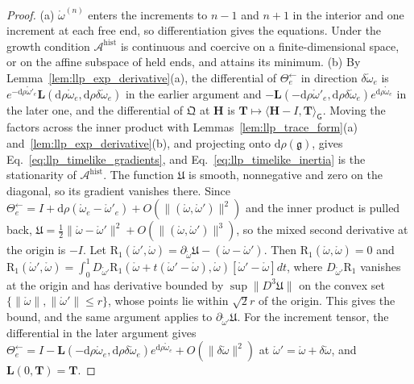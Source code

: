 \begin{proof}
(a) $\mathring\omega^{(n)}$ enters the increments to $n-1$ and $n+1$ in the interior and one increment at each free end, so differentiation gives the equations. Under the growth condition $\mathcal A^{\mathrm{hist}}$ is continuous and coercive on a finite-dimensional space, or on the affine subspace of held ends, and attains its minimum.
(b) By Lemma~\ref{lem:llp_exp_derivative}(a), the differential of $\Theta^{\leftarrow}_e$ in direction $\delta\mathring\omega_e$ is $e^{-\mathrm d\rho\mathring\omega'_e}\mathbf L(\mathrm d\rho\mathring\omega_e,\mathrm d\rho\delta\mathring\omega_e)$ in the earlier argument and $-\mathbf L(-\mathrm d\rho\mathring\omega'_e,\mathrm d\rho\delta\mathring\omega_e)e^{\mathrm d\rho\mathring\omega_e}$ in the later one, and the differential of $\mathfrak Q$ at $\mathbf H$ is $\mathbf T\mapsto\langle\mathbf H-I,\mathbf T\rangle_{\mathsf G}$. Moving the factors across the inner product with Lemmas~\ref{lem:llp_trace_form}(a) and~\ref{lem:llp_exp_derivative}(b), and projecting onto $\mathrm d\rho(\mathfrak g)$, gives Eq.~\eqref{eq:llp_timelike_gradients}, and Eq.~\eqref{eq:llp_timelike_inertia} is the stationarity of $\mathcal A^{\mathrm{hist}}$. The function $\mathfrak U$ is smooth, nonnegative and zero on the diagonal, so its gradient vanishes there. Since $\Theta^{\leftarrow}_e=I+\mathrm d\rho(\mathring\omega_e-\mathring\omega'_e)+O(\|(\mathring\omega,\mathring\omega')\|^2)$ and the inner product is pulled back, $\mathfrak U=\frac12\|\mathring\omega-\mathring\omega'\|^2+O(\|(\mathring\omega,\mathring\omega')\|^3)$, so the mixed second derivative at the origin is $-I$. Let $\mathrm R_1(\mathring\omega',\mathring\omega)=\partial_{\mathring\omega}\mathfrak U-(\mathring\omega-\mathring\omega')$. Then $\mathrm R_1(\mathring\omega,\mathring\omega)=0$ and $\mathrm R_1(\mathring\omega',\mathring\omega)=\int_0^1D_{\mathring\omega'}\mathrm R_1(\mathring\omega+t(\mathring\omega'-\mathring\omega),\mathring\omega)[\mathring\omega'-\mathring\omega]dt$, where $D_{\mathring\omega'}\mathrm R_1$ vanishes at the origin and has derivative bounded by $\sup\|D^3\mathfrak U\|$ on the convex set $\{\|\mathring\omega\|,\|\mathring\omega'\|\leq r\}$, whose points lie within $\sqrt2r$ of the origin. This gives the bound, and the same argument applies to $\partial_{\mathring\omega'}\mathfrak U$. For the increment tensor, the differential in the later argument gives $\Theta^{\leftarrow}_e=I-\mathbf L(-\mathrm d\rho\mathring\omega_e,\mathrm d\rho\delta\mathring\omega_e)e^{\mathrm d\rho\mathring\omega_e}+O(\|\delta\mathring\omega\|^2)$ at $\mathring\omega'=\mathring\omega+\delta\mathring\omega$, and $\mathbf L(0,\mathbf T)=\mathbf T$.
\end{proof}

